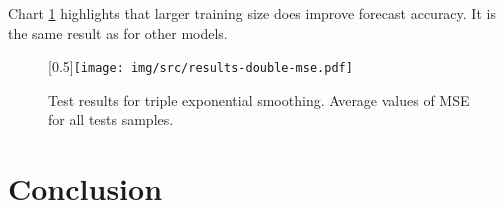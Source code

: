         Chart \ref{img:results-triple-mse} highlights that larger training size does improve forecast accuracy. It is
        the same result as for other models.

        \begin{figure}[H]
            \begin{center}
                \scalebox{0.65}[0.5]{\texttt{[image: img/src/results-double-mse.pdf]}}
                \caption{Test results for triple exponential smoothing. Average values of MSE for all tests samples.}
                \label{img:results-triple-mse}
            \end{center}
        \end{figure}

\chapter{Conclusion} \label{chap:conclusion}


